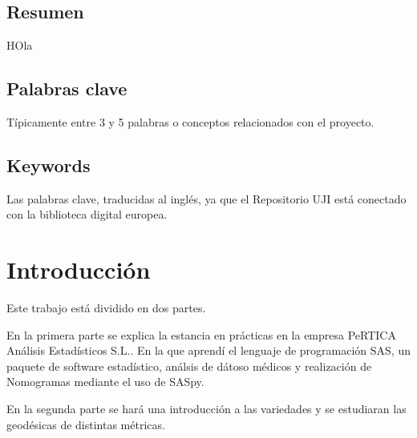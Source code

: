 \documentclass[pdftex,11pt,a4paper]{book}
\begin{document}
\thispagestyle{empty} %

\cleardoublepage %

\section*{Resumen}
HOla 
\section*{Palabras clave}

Típicamente entre 3 y 5 palabras o conceptos relacionados con el proyecto.

\section*{Keywords}

Las palabras clave, traducidas al inglés, ya que el Repositorio UJI está conectado con la biblioteca digital europea.

\thispagestyle{empty} %

\cleardoublepage




\pagestyle{plain} %

\tableofcontents

\cleardoublepage





\chapter{Introducción}

Este trabajo está dividido en dos partes.

En la primera parte se explica la estancia en prácticas en la empresa PeRTICA Análisis Estadísticos S.L.. En la que aprendí el lenguaje de programación SAS, un paquete de software estadístico, análsis de dátoso médicos y realización de Nomogramas mediante el uso de SASpy.

En la segunda parte se hará una introducción a las variedades y se estudiaran las geodésicas de distintas métricas.
\end{document}
